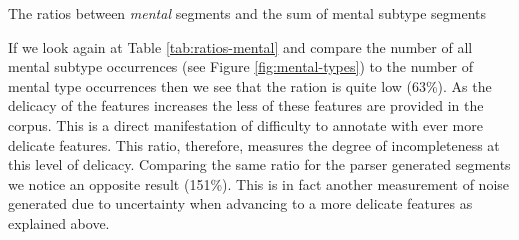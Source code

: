  \begin{table}[!ht]
     \begin{minipage}[t]{0.495\textwidth}
         \centering
         \caption{The ratios between \textit{mental} segments and the sum of mental subtype segments}
         \label{tab:ratios-mental}
     \end{minipage}
     \quad
     \begin{minipage}[t]{0.495\textwidth}
         \centering
         \caption{The ratios between \textit{relational} segments and the sum of mental subtype segments}
         \label{tab:ratios-relational}
     \end{minipage}
 \end{table}

If we look again at Table \ref{tab:ratios-mental} and compare the number of all mental subtype occurrences (see Figure \ref{fig:mental-types}) to the number of mental type occurrences then we see that the ration is quite low (63\%). As the delicacy of the features increases the less of these features are provided in the corpus. This is a direct manifestation of difficulty to annotate with ever more delicate features. This ratio, therefore, measures the degree of incompleteness at this level of delicacy. Comparing the same ratio for the parser generated segments we notice an opposite result (151\%). This is in fact another measurement of noise generated due to uncertainty when advancing to a more delicate features as explained above. 

